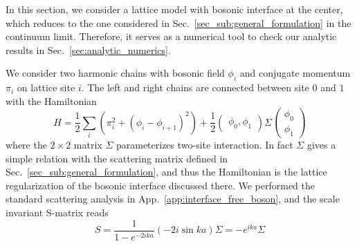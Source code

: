 
In this section, we consider a lattice model with bosonic interface at the center\cite{peschel_exact_2012,calabrese_entanglement_2012}, which reduces to the one considered in Sec.~\ref{sec_sub:general_formulation} in the continuum limit\cite{sakai_entanglement_2008}. Therefore, it serves as a numerical tool to check our analytic results in Sec.~\ref{sec:analytic_numerics}. 


We consider two harmonic chains with bosonic field $\phi_i$ and conjugate momentum $\pi_i$ on lattice site $i$. The left and right chains are connected between site $0$ and $1$ with the Hamiltonian
\begin{equation}
\label{eq:lattice_H}
H = \frac{1}{2} \sum_i \left(\pi_i^2  + ( \phi_i - \phi_{i+1} )^2 \right) +  \frac{1}{2} \begin{pmatrix}  \phi_0, \phi_1 \end{pmatrix}
\Sigma
\begin{pmatrix}
\phi_0 \\
\phi_1 
\end{pmatrix}
\end{equation}
where the $2\times2$ matrix $\Sigma$ parameterizes two-site interaction. In fact $\Sigma$ gives a simple relation with the scattering matrix defined in Sec.~\ref{sec_sub:general_formulation}, and thus the Hamiltonian is the lattice regularization of the bosonic interface discussed there. We performed the standard scattering analysis in App.~\ref{app:interface_free_boson}, and the scale invariant S-matrix reads
\begin{equation}
S = \frac{1}{1 - e^{-2ika } } ( -2i \sin ka ) \Sigma
 = - e^{ika} \Sigma
\end{equation}
